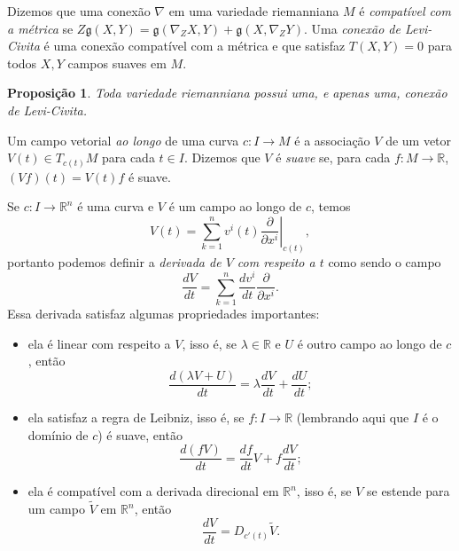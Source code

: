 \documentclass{article}
\newtheorem{proposition}[definition]{Proposição}
\begin{document}
Dizemos que uma conexão $\nabla$ em uma variedade riemanniana $M$ é \textit{compatível com a métrica} se $Z\mathfrak{g}(X,Y) = \mathfrak{g}(\nabla_ZX, Y) + \mathfrak{g}(X, \nabla_ZY)$. Uma \textit{conexão de Levi-Civita} é uma conexão compatível com a métrica e que satisfaz $T(X,Y) = 0$ para todos $X, Y$ campos suaves em $M$.

\begin{proposition}
    Toda variedade riemanniana possui uma, e apenas uma, conexão de Levi-Civita.
\end{proposition}

Um campo vetorial \textit{ao longo} de uma curva $c \colon I \to M$ é a associação $V$ de um vetor $V(t) \in T_{c(t)}M$ para cada $t \in I$. Dizemos que $V$ é \textit{suave} se, para cada $f \colon M \to \mathbb{R}$, $(Vf)(t) = V(t)f$ é suave.

Se $c \colon I \to \mathbb{R}^n$ é uma curva e $V$ é um campo ao longo de $c$, temos \begin{equation}
    V(t) = \sum_{k = 1}^n v^i(t)\left.\frac{\partial}{\partial x^i}\right|_{c(t)},
\end{equation}
portanto podemos definir a \textit{derivada de $V$ com respeito a $t$} como sendo o campo \begin{equation}
    \frac{dV}{dt} = \sum_{k = 1}^n \frac{dv^i}{dt}\frac{\partial}{\partial x^i}.
\end{equation} Essa derivada satisfaz algumas propriedades importantes:
\begin{itemize}
    \item ela é linear com respeito a $V$, isso é, se $\lambda \in \mathbb{R}$ e $U$ é outro campo ao longo de $c$, então \begin{equation}
        \frac{d(\lambda V + U)}{dt} = \lambda\frac{dV}{dt} + \frac{dU}{dt};
    \end{equation}

    \item ela satisfaz a regra de Leibniz, isso é, se $f \colon I \to \mathbb{R}$ (lembrando aqui que $I$ é o domínio de $c$) é suave, então \begin{equation}
        \frac{d(fV)}{dt} = \frac{df}{dt}V + f\frac{dV}{dt};
    \end{equation}

    \item ela é compatível com a derivada direcional em $\mathbb{R}^n$, isso é, se $V$ se estende para um campo $\tilde{V}$ em $\mathbb{R}^n$, então \begin{equation}
        \frac{dV}{dt} = D_{c'(t)}\tilde{V}.
    \end{equation}
\end{itemize}
\end{document}
